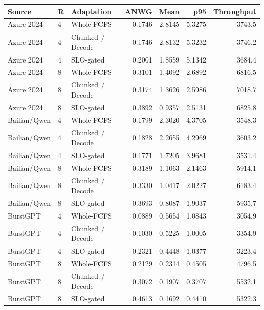 \begin{tabular}{lllr r r r}\toprule
Source & R & Adaptation & ANWG & Mean & p95 & Throughput \\ \midrule
Azure 2024 & 4 & Whole-FCFS & 0.1746 & 2.8145 & 5.3275 & 3743.5 \\
Azure 2024 & 4 & Chunked / Decode & 0.1746 & 2.8132 & 5.3232 & 3746.2 \\
Azure 2024 & 4 & SLO-gated & 0.2001 & 1.8559 & 5.1342 & 3684.4 \\
Azure 2024 & 8 & Whole-FCFS & 0.3101 & 1.4092 & 2.6892 & 6816.5 \\
Azure 2024 & 8 & Chunked / Decode & 0.3174 & 1.3626 & 2.5986 & 7018.7 \\
Azure 2024 & 8 & SLO-gated & 0.3892 & 0.9357 & 2.5131 & 6825.8 \\
Bailian/Qwen & 4 & Whole-FCFS & 0.1799 & 2.3020 & 4.3705 & 3548.3 \\
Bailian/Qwen & 4 & Chunked / Decode & 0.1828 & 2.2655 & 4.2969 & 3603.2 \\
Bailian/Qwen & 4 & SLO-gated & 0.1771 & 1.7205 & 3.9681 & 3531.4 \\
Bailian/Qwen & 8 & Whole-FCFS & 0.3189 & 1.1063 & 2.1463 & 5914.1 \\
Bailian/Qwen & 8 & Chunked / Decode & 0.3330 & 1.0417 & 2.0227 & 6183.4 \\
Bailian/Qwen & 8 & SLO-gated & 0.3693 & 0.8087 & 1.9037 & 5935.7 \\
BurstGPT & 4 & Whole-FCFS & 0.0889 & 0.5654 & 1.0843 & 3054.9 \\
BurstGPT & 4 & Chunked / Decode & 0.1030 & 0.5225 & 1.0005 & 3354.9 \\
BurstGPT & 4 & SLO-gated & 0.2321 & 0.4448 & 1.0377 & 3223.4 \\
BurstGPT & 8 & Whole-FCFS & 0.2129 & 0.2314 & 0.4505 & 4796.5 \\
BurstGPT & 8 & Chunked / Decode & 0.3072 & 0.1907 & 0.3707 & 5532.1 \\
BurstGPT & 8 & SLO-gated & 0.4613 & 0.1692 & 0.4410 & 5322.3 \\
\bottomrule\end{tabular}
